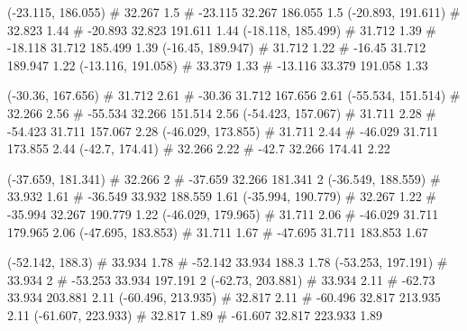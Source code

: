 \documentclass[a4paper,openbib,10pt]{article}
\newenvironment{treegraph}{\begin{graph}}{\end{graph}}
\begin{document}
\begin{treegraph}
  (-23.115, 186.055) #     32.267    1.5
   #    -23.115    32.267    186.055    1.5
  (-20.893, 191.611) #     32.823    1.44
   #    -20.893    32.823    191.611    1.44
  (-18.118, 185.499) #     31.712    1.39
   #    -18.118    31.712    185.499    1.39
  (-16.45, 189.947) #     31.712    1.22
   #    -16.45    31.712    189.947    1.22
  (-13.116, 191.058) #     33.379    1.33
   #    -13.116    33.379    191.058    1.33

  (-30.36, 167.656) #     31.712    2.61
   #    -30.36    31.712    167.656    2.61
  (-55.534, 151.514) #     32.266    2.56
   #    -55.534    32.266    151.514    2.56
  (-54.423, 157.067) #     31.711    2.28
   #    -54.423    31.711    157.067    2.28
  (-46.029, 173.855) #     31.711    2.44
   #    -46.029    31.711    173.855    2.44
  (-42.7, 174.41) #     32.266    2.22
   #    -42.7    32.266    174.41    2.22

  (-37.659, 181.341) #     32.266    2
   #    -37.659    32.266    181.341    2
  (-36.549, 188.559) #     33.932    1.61
   #    -36.549    33.932    188.559    1.61
  (-35.994, 190.779) #     32.267    1.22
   #    -35.994    32.267    190.779    1.22
  (-46.029, 179.965) #     31.711    2.06
   #    -46.029    31.711    179.965    2.06
  (-47.695, 183.853) #     31.711    1.67
   #    -47.695    31.711    183.853    1.67

  (-52.142, 188.3) #     33.934    1.78
   #    -52.142    33.934    188.3    1.78
  (-53.253, 197.191) #     33.934    2
   #    -53.253    33.934    197.191    2
  (-62.73, 203.881) #     33.934    2.11
   #    -62.73    33.934    203.881    2.11
  (-60.496, 213.935) #     32.817    2.11
   #    -60.496    32.817    213.935    2.11
  (-61.607, 223.933) #     32.817    1.89
   #    -61.607    32.817    223.933    1.89


\end{treegraph}
\end{document}
